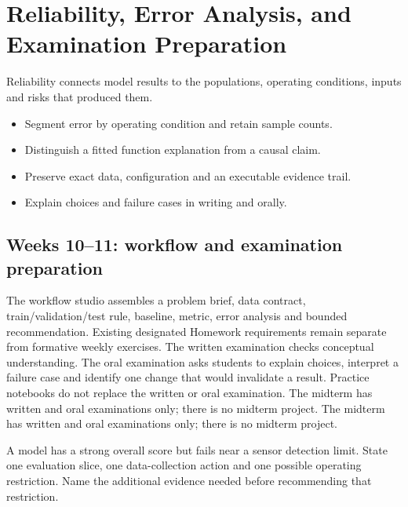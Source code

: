 \chapter{Reliability, Error Analysis, and Examination Preparation}\label{chap:reliability}
 Reliability connects model results to the populations, operating conditions, inputs and risks that produced them.
\begin{learningbox}
\begin{itemize}
\item Segment error by operating condition and retain sample counts.
\item Distinguish a fitted function explanation from a causal claim.
\item Preserve exact data, configuration and an executable evidence trail.
\item Explain choices and failure cases in writing and orally.
\end{itemize}
\end{learningbox}


\section{Weeks 10--11: workflow and examination preparation}
The workflow studio assembles a problem brief, data contract, train/validation/test rule, baseline, metric, error analysis and bounded recommendation. Existing designated Homework requirements remain separate from formative weekly exercises. The written examination checks conceptual understanding. The oral examination asks students to explain choices, interpret a failure case and identify one change that would invalidate a result. Practice notebooks do not replace the written or oral examination. The midterm has written and oral examinations only; there is no midterm project. The midterm has written and oral examinations only; there is no midterm project.
\begin{checkpointbox}
A model has a strong overall score but fails near a sensor detection limit. State one evaluation slice, one data-collection action and one possible operating restriction. Name the additional evidence needed before recommending that restriction.
\end{checkpointbox}
